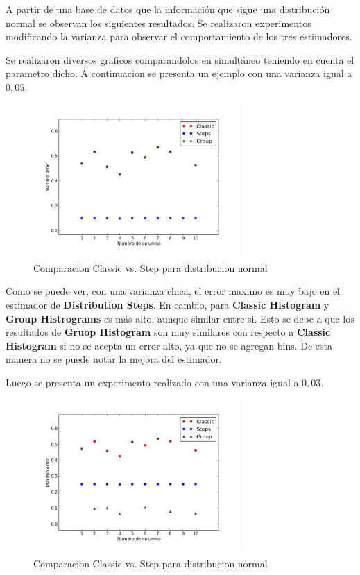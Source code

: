 \documentclass[10pt, a4paper,english,spanish,hidelinks]{article}
\begin{document}
{{A partir de una base de datos que la información que sigue una distribución normal se observan los siguientes resultados. Se realizaron experimentos modificando la varianza para observar el comportamiento de los tres estimadores.

Se realizaron diversos graficos comparandolos en simultáneo teniendo en cuenta el parametro dicho. 
A continuacion se presenta un ejemplo con una varianza igual a $0,05$. 

\begin{figure}[h!]
  \centering
  \includegraphics[width=0.7\textwidth]{./imagenes/ejb2_normal_t_005.png}
  \caption{Comparacion Classic vs. Step para distribucion normal}
\end{figure}

Como se puede ver, con una varianza chica, el error maximo es muy bajo en el estimador de \textbf{Distribution Steps}. En cambio, para \textbf{Classic Histogram} y \textbf{Group Histrograms} es más alto, aunque similar entre si. Esto se debe a que los resultados de \textbf{Gruop Histogram} son muy similares con respecto a \textbf{Classic Histogram} si no se acepta un error alto, ya que no se agregan bins. De esta manera no se puede notar la mejora del estimador.


Luego se presenta un experimento realizado con una varianza igual a $0,03$. 
\newpage
\begin{figure}
  \centering
  \includegraphics[width=0.7\textwidth]{./imagenes/ejb2_normal_t_003.png}
  \caption{Comparacion Classic vs. Step para distribucion normal}
\end{figure}

}}
\end{document}
